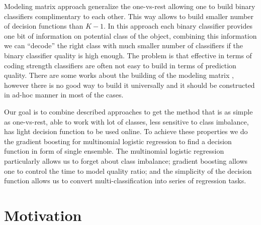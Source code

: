 \documentclass{article}
\begin{document}
Modeling matrix approach generalize the one-vs-rest allowing one to build binary classifiers complimentary to each other. This way allows to build smaller number of decision functions than $K-1$. In this approach each binary classifier provides one bit of information on potential class of the object, combining this information we can ``decode'' the right class with much smaller number of classifiers if the binary classifier quality is high enough. The problem is that effective in terms of coding strength classifiers are often not easy to build in terms of prediction quality. There are some works about the building of the modeling matrix \cite{Zhao_sparseoutput, modelmatrix2}, however there is no good way to build it universally and it should be constructed in ad-hoc manner in most of the cases.

Our goal is to combine described approaches to get the method that is as simple as one-vs-rest, able to work with lot of classes, less sensitive to class imbalance, has light decision function to be used online. To achieve these properties we do the gradient boosting for multinomial logistic regression to find a decision function in form of single ensemble. The multinomial logistic regression particularly allows us to forget about class imbalance; gradient boosting allows one to control the time to model quality ratio; and the simplicity of the decision function allows us to convert multi-classification into series of regression tasks.





\section{Motivation}
\end{document}
